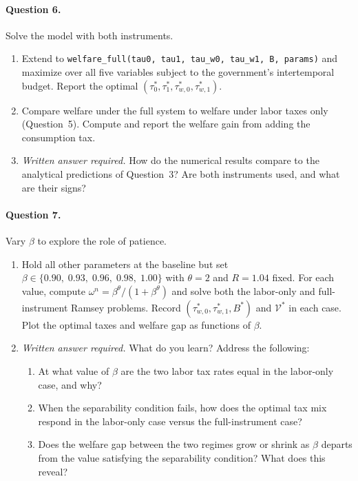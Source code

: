 \paragraph{Question 6.}
Solve the model with both instruments.
 
\begin{enumerate}[label=(\alph*)]
    \item Extend to \texttt{welfare\_full(tau0, tau1, tau\_w0, tau\_w1, B, params)} and maximize over all five variables subject to the government's intertemporal budget. Report the optimal $(\tau_0^*, \tau_1^*, \tau_{w,0}^*, \tau_{w,1}^*)$.
 
    \item Compare welfare under the full system to welfare under labor taxes only (Question~5). Compute and report the welfare gain from adding the consumption tax.
 
    \item \emph{Written answer required.} How do the numerical results compare to the analytical predictions of Question~3? Are both instruments used, and what are their signs?
\end{enumerate}
 
\paragraph{Question 7.}
Vary $\beta$ to explore the role of patience.
 
\begin{enumerate}[label=(\alph*)]
    \item Hold all other parameters at the baseline but set $\beta \in \{0.90,\; 0.93,\; 0.96,\; 0.98,\; 1.00\}$ with $\theta = 2$ and $R = 1.04$ fixed. For each value, compute $\omega^n = \beta^\theta/(1+\beta^\theta)$ and solve both the labor-only and full-instrument Ramsey problems. Record $(\tau_{w,0}^*, \tau_{w,1}^*, B^*)$ and $\mathcal{V}^*$ in each case. Plot the optimal taxes and welfare gap as functions of $\beta$.
 
    \item \emph{Written answer required.} What do you learn? Address the following:
    \begin{enumerate}[label=(\roman*)]
        \item At what value of $\beta$ are the two labor tax rates equal in the labor-only case, and why?
        \item When the separability condition fails, how does the optimal tax mix respond in the labor-only case versus the full-instrument case?
        \item Does the welfare gap between the two regimes grow or shrink as $\beta$ departs from the value satisfying the separability condition? What does this reveal?
    \end{enumerate}
\end{enumerate}
 
